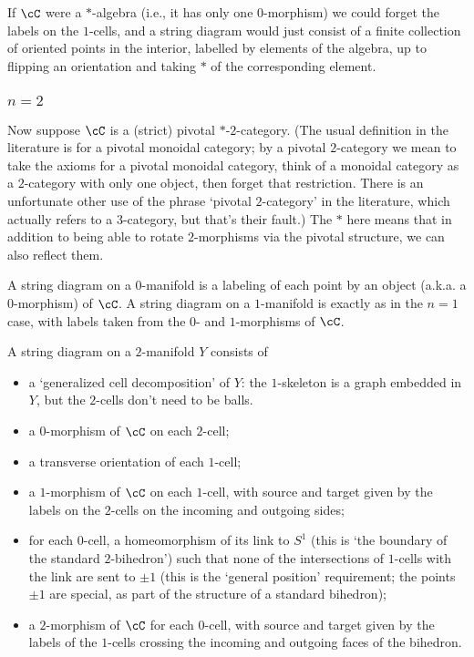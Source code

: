 \documentclass[11pt]{amsart}
\theoremstyle{plain}
\begin{document}
If $\cC$ were a $*$-algebra (i.e., it has only one $0$-morphism) we could forget the labels on the $1$-cells, and a string diagram would just consist of a finite collection of oriented points in the interior, labelled by elements of the algebra, up to flipping an orientation and taking $*$ of the corresponding element.

\subsubsection{$n=2$}
Now suppose $\cC$ is a (strict) pivotal $*$-$2$-category. (The usual definition in the literature is for a pivotal monoidal category; by a pivotal $2$-category we mean to take the axioms for a pivotal monoidal category, think of a monoidal category as a $2$-category with only one object, then forget that restriction. There is an unfortunate other use of the phrase `pivotal $2$-category' in the literature, which actually refers to a $3$-category, but that's their fault.) The $*$ here means that in addition to being able to rotate $2$-morphisms via the pivotal structure, we can also reflect them.

A string diagram on a $0$-manifold is a labeling of each point by an object (a.k.a. a $0$-morphism) of $\cC$. A string diagram on a $1$-manifold is exactly as in the $n=1$ case, with labels taken from the $0$- and $1$-morphisms of $\cC$.

A string diagram on a $2$-manifold $Y$ consists of
\begin{itemize}
\item a `generalized cell decomposition' of $Y$: the $1$-skeleton is a graph embedded in $Y$, but the $2$-cells don't need to be balls.
\item a $0$-morphism of $\cC$ on each $2$-cell;
\item a transverse orientation of each $1$-cell;
\item a $1$-morphism of $\cC$ on each $1$-cell, with source and target given by the labels on the $2$-cells on the incoming and outgoing sides;
\item for each $0$-cell, a homeomorphism of its link to $S^1$ (this is `the boundary of the standard $2$-bihedron') such that none of the intersections of $1$-cells with the link are sent to $\pm 1$ (this is the `general position' requirement; the points $\pm 1$ are special, as part of the structure of a standard bihedron);
\item a $2$-morphism of $\cC$ for each $0$-cell, with source and target given by the labels of the $1$-cells crossing the incoming and outgoing faces of the bihedron.
\end{itemize}
\end{document}
